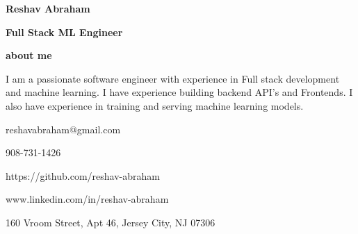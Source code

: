\documentclass{article}
\begin{document}
\begin{minipage}[t][0pt]{8in\linewidth}
    \begin{minipage}[t]{5.5in\linewidth}
    \Huge\vspace{0in}\hspace{-0.30em}\textbf{Reshav Abraham}  

    \vspace{0em}\hspace{-0.2em}\Large\textbf{Full Stack ML Engineer} 

    \vspace{0.5em}\hspace{0em}\small\textbf{about me} 

        \begin{minipage}[t]{0.6\textwidth\hspace{0em}}
        I am a passionate software engineer with experience in Full stack development
        and machine learning. I have experience building backend API's and Frontends. I also have experience in training and serving machine learning models. \par
        \end{minipage}
    \end{minipage}
    \begin{minipage}[t]{17em\linewidth\hspace{-3em}}
        
        \vspace{0.7em}
        \faEnvelopeO\hspace{0.4em}\small\mdseries\textrm{reshavabraham@gmail.com}

        \faPhone\hspace{0.4em}\small\mdseries\textrm{908-731-1426}
        
        \faGithub\hspace{0.4em}\small\mdseries\textrm{https://github.com/reshav-abraham}

        \faLinkedin\hspace{0.4em}\small\mdseries\textrm{www.linkedin.com/in/reshav-abraham}

        \faHome\hspace{0.4em}\small\mdseries\textrm{160 Vroom Street, Apt 46, Jersey City, NJ 07306}
    \end{minipage}

\vspace{0.5em}

\begin{minipage}[t]{0.45\textwidth\hspace{0in}}


\end{minipage}
\end{minipage}
\end{document}
